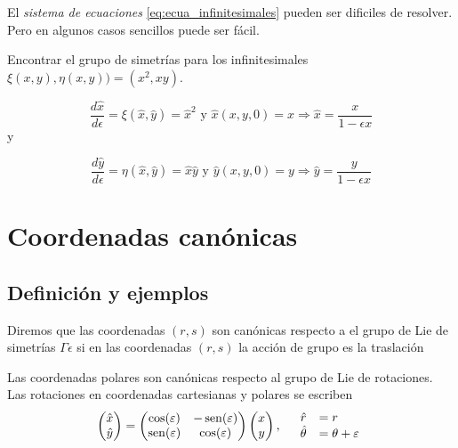 El \emph{sistema de ecuaciones} \eqref{eq:ecua_infinitesimales}    pueden ser dificiles de resolver. Pero en algunos casos sencillos puede ser fácil.

 \begin{ejemplo} Encontrar el grupo de simetrías para los infinitesimales $\xi(x,y),\eta(x,y))=(x^2,xy)$.
   \end{ejemplo}



\[ \frac{d\hat{x}}{d\epsilon}=\xi(\hat{x},\hat{y})=\hat{x}^2\text{ y }\hat{x}(x,y,0)=x
\Rightarrow \hat{x}=\frac{x}{1-\epsilon x}\]
y

\[ \frac{d\hat{y}}{d\epsilon}=\eta(\hat{x},\hat{y})=\hat{x}\hat{y}\text{ y }\hat{y}(x,y,0)=y
\Rightarrow \hat{y}=\frac{y}{1-\epsilon x}\]






\section{Coordenadas canónicas}

\subsection{Definición y ejemplos}
\begin{definicion}   Diremos que las coordenadas $(r,s)$ son canónicas respecto a el grupo de Lie de simetrías $\Gamma{\epsilon}$  si en las coordenadas $(r,s)$ la acción de grupo es la traslación

\end{definicion}
 \begin{ejemplo} Las coordenadas polares son canónicas respecto al grupo de Lie de rotaciones. Las rotaciones en coordenadas cartesianas y polares se escriben
\[
 \begin{pmatrix} \hat{x}\\ \hat{y}
\end{pmatrix}=\begin{pmatrix} \cos(\varepsilon) & -\operatorname{sen}(\varepsilon)
\\ \operatorname{sen}(\varepsilon) & \cos(\varepsilon)
\end{pmatrix} \begin{pmatrix} x\\ y
\end{pmatrix},\quad \begin{array}{ll} \hat{r}&=r\\ \hat{\theta}&=\theta+\varepsilon\\ 
\end{array}
\]
\end{ejemplo}


